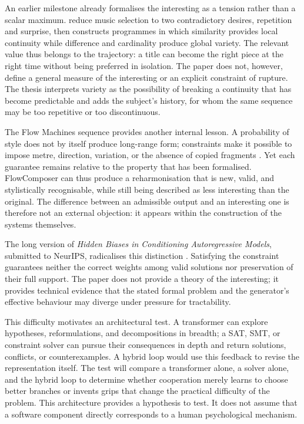 \documentclass[11pt,a4paper]{article}
\begin{document}
An earlier milestone already formalises the interesting as a tension rather than a
scalar maximum. \textcite{pachet1999programs} reduce music selection to two
contradictory desires, repetition and surprise, then constructs programmes in which
similarity provides local continuity while difference and cardinality produce global
variety. The relevant value thus belongs to the trajectory: a title can become the
right piece at the right time without being preferred in isolation. The paper does not,
however, define a general measure of the interesting or an explicit constraint of
rupture. The thesis interprets variety as the possibility of breaking a continuity
that has become predictable and adds the subject's history, for whom the same sequence
may be too repetitive or too discontinuous.

The Flow Machines sequence provides another internal lesson. A probability of style
does not by itself produce long-range form; constraints make it possible to impose
metre, direction, variation, or the absence of copied fragments
\parencite{pachet2011markov,barbieri2012lyrics,papadopoulos2014avoiding,
papadopoulos2016nonplagiaristic,papadopoulos2016flowcomposer,
pachet2017variations}. Yet each guarantee remains relative to the property that has
been formalised. FlowComposer can thus produce a reharmonisation that is new, valid,
and stylistically recognisable, while still being described as less interesting than
the original. The difference between an admissible output and an interesting one is
therefore not an external objection: it appears within the construction of the systems
themselves.

The long version of \emph{Hidden Biases in Conditioning Autoregressive Models},
submitted to NeurIPS, radicalises this distinction
\parencite{pachet2026biases}. Satisfying the constraint guarantees neither the
correct weights among valid solutions nor preservation of their full support.
The paper does not provide a theory of the interesting; it provides technical
evidence that the stated formal problem and the generator's effective behaviour
may diverge under pressure for tractability.

This difficulty motivates an architectural test. A transformer can explore
hypotheses, reformulations, and decompositions in breadth; a SAT, SMT, or
constraint solver can pursue their consequences in depth and return solutions,
conflicts, or counterexamples. A hybrid loop would use this feedback to revise
the representation itself. The test will compare a transformer alone, a solver
alone, and the hybrid loop to determine whether cooperation merely learns to
choose better branches or invents grips that change the practical difficulty of
the problem. This architecture provides a hypothesis to test. It does not assume
that a software component directly corresponds to a human psychological mechanism.
\end{document}
